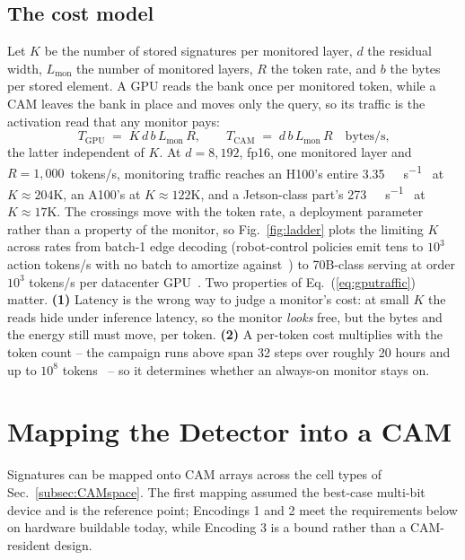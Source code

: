 \documentclass[conference]{IEEEtran}
\newcommand{\cam}{{CAM}\xspace}
\begin{document}
\subsection{The cost model}
\label{sec:Scaling}
\label{subsec:CostModel}
\label{subsec:Ladder}
Let $K$ be the number of stored signatures per monitored layer, $d$
the residual width, $L_{\mathrm{mon}}$ the number of monitored
layers, $R$ the token rate, and $b$ the bytes per stored element. A
GPU reads the bank once per monitored token, while a \cam leaves the
bank in place and moves only the query, so its traffic is the
activation read that any monitor pays:
%
\begin{equation}
T_{\mathrm{GPU}} \;=\; K \, d \, b \, L_{\mathrm{mon}} \, R, \qquad
T_{\mathrm{CAM}} \;=\; d \, b \, L_{\mathrm{mon}} \, R
\quad\text{bytes/s,}
\label{eq:gputraffic}
\end{equation}
%
the latter independent of $K$. At $d=8{,}192$, fp16, one monitored
layer and $R=1{,}000$~tokens/s, monitoring traffic reaches an H100's
entire \qty{3.35}{\tera\byte\per\second}~\cite{nvidia_h100} at
$K\!\approx\!204$K, an A100's at $K\!\approx\!122$K, and a
Jetson-class part's
\qty{273}{\giga\byte\per\second}~\cite{nvidia_thor} at
$K\!\approx\!17$K. The crossings move with the token rate, a
deployment parameter rather than a property of the monitor, so
Fig.~\ref{fig:ladder} plots the limiting $K$ across rates from
batch-1 edge decoding (robot-control policies emit tens to $10^{3}$
action tokens/s with no batch to amortize
against~\cite{vlaperf2026}) to 70B-class serving at order $10^{3}$
tokens/s per datacenter GPU~\cite{lyceum2026tps}. Two properties of
Eq.~(\ref{eq:gputraffic}) matter. {\bf (1)} Latency is the wrong
way to judge a monitor's cost: at small $K$ the reads hide under
inference latency, so the monitor \emph{looks} free, but the bytes
and the energy still must move, per token. {\bf (2)} A per-token
cost multiplies with the token count -- the campaign runs above span
32 steps over roughly 20 hours and up to $10^{8}$
tokens~\cite{aisi2026cyber} -- so it determines whether an always-on
monitor stays on.

\section{Mapping the Detector into a CAM}
\label{sec:Mapping}
Signatures can be mapped onto \cam arrays across the cell types of
Sec.~\ref{subsec:CAMspace}. The first mapping assumed the best-case
multi-bit device and is the reference point; Encodings 1 and 2 meet
the requirements below on hardware buildable today, while Encoding 3
is a bound rather than a \cam-resident design.
\end{document}
